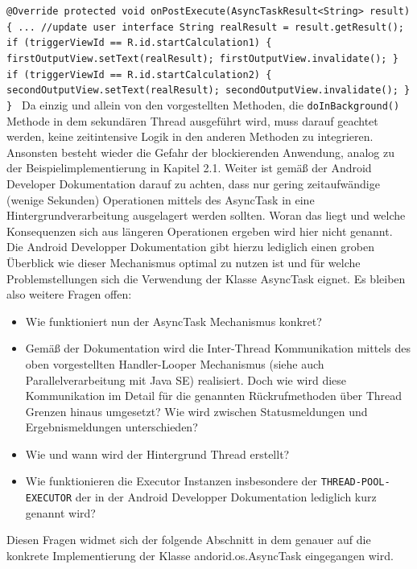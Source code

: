 \documentclass[12pt,oneside,a4paper,bibtotoc,liststotoc]{scrreprt}
\begin{document}
\newline
\texttt{@Override\newline
   protected void onPostExecute(AsyncTaskResult<String> result) \{\newline
...\newline
           //update user interface\newline
           String realResult = result.getResult();\newline
\newline
           if (triggerViewId == R.id.startCalculation1) \{\newline
               firstOutputView.setText(realResult);\newline
               firstOutputView.invalidate();\newline
           \}\newline
           if (triggerViewId == R.id.startCalculation2) \{\newline
               secondOutputView.setText(realResult);\newline
               secondOutputView.invalidate();\newline
           \}\newline
       \}\newline
}
Da einzig und allein von den vorgestellten Methoden, die \texttt{doInBackground()} Methode in dem sekundären Thread ausgeführt wird, muss darauf geachtet werden, keine zeitintensive Logik in den anderen Methoden zu integrieren. Ansonsten besteht wieder die Gefahr der blockierenden Anwendung, analog zu der Beispielimplementierung in Kapitel 2.1. Weiter ist gemäß der Android Developer Dokumentation darauf zu achten, dass nur gering zeitaufwändige (wenige Sekunden) Operationen mittels des AsyncTask in eine Hintergrundverarbeitung ausgelagert werden sollten. Woran das liegt und welche Konsequenzen sich aus längeren Operationen ergeben wird hier nicht genannt. Die Android Developper Dokumentation gibt hierzu lediglich einen groben Überblick wie dieser Mechanismus optimal zu nutzen ist und für welche Problemstellungen sich die Verwendung der Klasse AsyncTask eignet. Es bleiben also weitere Fragen offen:
\begin{itemize}
\item Wie funktioniert nun der AsyncTask Mechanismus konkret?
\item Gemäß der Dokumentation wird die Inter-Thread Kommunikation mittels des oben vorgestellten Handler-Looper Mechanismus (siehe auch Parallelverarbeitung mit Java SE) realisiert. Doch wie wird diese Kommunikation im Detail für die genannten Rückrufmethoden über Thread Grenzen hinaus umgesetzt? Wie wird zwischen Statusmeldungen und Ergebnismeldungen unterschieden?
\item Wie und wann wird der Hintergrund Thread erstellt?
\item Wie funktionieren die Executor Instanzen insbesondere der \texttt{THREAD-POOL-EXECUTOR} der in der Android Developper Dokumentation lediglich kurz genannt wird?
\end{itemize}
Diesen Fragen widmet sich der folgende Abschnitt in dem genauer auf die konkrete Implementierung der Klasse andorid.os.AsyncTask eingegangen wird.
\end{document}
